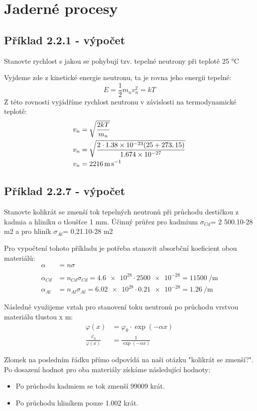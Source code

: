 \section{Jaderné procesy}

\subsection{Příklad 2.2.1 - výpočet}
\begin{zadani}
    Stanovte rychlost s jakou se pohybují  tzv. tepelné neutrony
    při teplotě 25 °C 
\end{zadani}

Vyjdeme zde z kinetické energie neutronu, ta je rovna jeho energii tepelné:
\[
    E=\frac{1}{2}m_{n} v_{n}^{2}=kT 
\]
Z této rovnosti vyjádříme rychlost neutronu v závislosti na termodynamické teplotě:
\begin{align*}
  v_{n} &= \sqrt{\frac{2kT}{m_{n}}} \\ 
  v_{n} &= \sqrt{\frac{2\cdot\num{1.38e-23}(25+273,15)}{\num{1,674e-27}}} \\ 
  v_{n} &= \qty{2216}{\meter\per\second}
\end{align*}


\subsection{Příklad 2.2.7 - výpočet}
\begin{zadani}
    Stanovte kolikrát se zmenší tok tepelných neutronů při průchodu
    destičkou z kadmia a hliníku o tloušťce 1 mm. Účinný průřez pro
    kadmium  \(\sigma_{Cd} \)= 2 500.10-28 m2  a pro hliník  \(\sigma_{Al} \)= 0,21.10-28 m2 
\end{zadani}

Pro vypočtení tohoto příkladu je potřeba stanovit absorbční koeficient obou materiálů:
\begin{align*}
    \alpha &= n\sigma \\\\
    \alpha_{Cd}  &= n_{Cd} \sigma_{Cd} = \num{4,6e28}\cdot \num{2500e-28}= \qty{11500}{\per\meter}\\
    \alpha_{Al}  &= n_{Al} \sigma_{Al} = \num{6,02e28}\cdot \num{0,21e-28}= \qty{1,26}{\per\meter}
\end{align*}

Následně využijeme vztah pro stanovení toku neutronů po průchodu vrstvou materiálu tlustou x m:
\begin{align*}
    \varphi(x) &= \varphi_{0} \cdot \exp(-\alpha x)\\
    \frac{\varphi_{0}}{\varphi(x)} &=\frac{1}{\exp(-\alpha x)}
\end{align*}

Zlomek na posledním řádku přímo odpovídá na naši otázku "kolikrát se zmenší?". Po dosazení hodnot pro oba materiály získáme následující hodnoty:
\begin{itemize}
    \item Po průchodu kadmiem se tok zmenší \num{99009} krát. 
    \item Po průchodu hliníkem pouze \num{1,002} krát.
\end{itemize}





